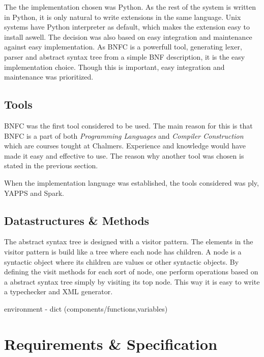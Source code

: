 The the implementation chosen was Python. As the rest of the system is
written in Python, it is only natural to write extensions in the same
language. Unix systems have Python interpreter as default, which makes
the extension easy to install aswell. The decision was also based on
easy integration and maintenance against easy implementation. As BNFC
is a powerfull tool, generating lexer, parser and abstract syntax tree
from a simple BNF description, it is the easy implementation
choice. Though this is important, easy integration and maintenance was
prioritized.


\subsection{Tools}
BNFC was the first tool considered to be used. The main reason for
this is that BNFC is a part of both \emph{Programming Languages} and
\emph{Compiler Construction} which are courses tought at
Chalmers. Experience and knowledge would have made it easy and
effective to use. The reason why another tool was chosen is stated in
the previous section.

When the implementation language was established, the tools considered
was ply, YAPPS and Spark.


\subsection{Datastructures \& Methods}
The abstract syntax tree is designed with a visitor pattern. The
elements in the visitor pattern is build like a tree where each node
has children. A node is a syntactic object where its children are
values or other syntactic objects. By defining the visit methods for
each sort of node, one perform operations based on a abstract syntax
tree simply by visiting its top node. This way it is easy to write a
typechecker and XML generator.

environment - dict (components/functions,variables)


\section{Requirements \& Specification}

